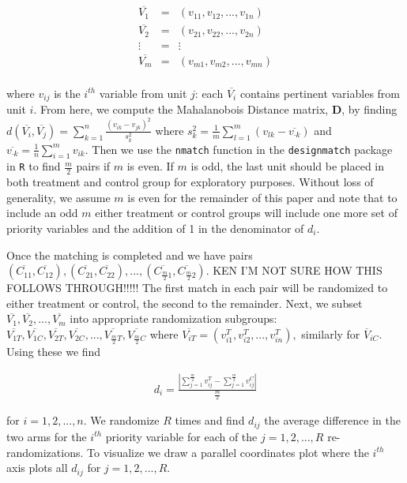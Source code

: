 \documentclass[]{sagej}
\begin{document}
\begin{eqnarray*}
 \overline{V_1} & = & (v_{11}, v_{12},..., v_{1n})\\
 \overline{V_2} & = & (v_{21}, v_{22},..., v_{2n})\\
 \vdots & = & \vdots\\    
 \overline{V_m} & = & (v_{m1}, v_{m2},..., v_{mn})\\
\end{eqnarray*}

where \(v_{ij}\) is the \(i^{th}\) variable from unit \(j\): each
\(\overline{V_i}\) contains pertinent variables from unit \(i\). From
here, we compute the Mahalanobois Distance matrix, \textbf{D}, by
finding
\(d(\overline{V_i}, \overline{V_j}) = \sum_{k=1}^n \frac{(v_{ik} - v_{jk})^2}{s_k^2}\)
where
\(s_k^2 = \frac{1}{m} \sum_{l=1}^m(v_{lk} - \overline{v_{\cdot k}})\)
and \(\overline{v_{\cdot k}} = \frac{1}{n} \sum_{i = 1}^m v_{ik}\). Then
we use the \texttt{nmatch} function in the \texttt{designmatch}
\citep{doi} package in \texttt{R} \citep{nmatch} to find \(\frac{m}{2}\)
pairs if \(m\) is even. If \(m\) is odd, the last unit should be placed
in both treatment and control group for exploratory purposes. Without
loss of generality, we assume \(m\) is even for the remainder of this
paper and note that to include an odd \(m\) either treatment or control
groups will include one more set of priority variables and the addition
of 1 in the denominator of \(d_i\).

Once the matching is completed and we have pairs
\((\overline{C_{11}}, \overline{C_{12}}), (\overline{C_{21}}, \overline{C_{22}}), ..., (\overline{C_{\frac{m}{2}1}}, \overline{C_{\frac{m}{2}2}}).\)
KEN I'M NOT SURE HOW THIS FOLLOWS THROUGH!!!!! The first match in each
pair will be randomized to either treatment or control, the second to
the remainder. Next, we subset
\(\overline{V_1}, \overline{V_2}, ..., \overline{V_m}\) into appropriate
randomization subgroups:
\(\overline{V_{1T}}, \overline{V_{1C}}, \overline{V_{2T}}, \overline{V_{2C}},..., \overline{V_{\frac{m}{2}T}}, \overline{V_{\frac{m}{2}C}}\)
where \(\overline{V_{iT}} = (v_{i1}^T, v_{i2}^T,..., v_{in}^T),\)
similarly for \(\overline{V}_{iC}.\) Using these we find

\begin{eqnarray*}
 d_i = \frac{| \sum_{j = 1}^{\frac{m}{2}}v_{ij}^T - \sum_{j = 1}^{\frac{m}{2}}v_{ij}^C |}{\frac{m}{2}} 
\end{eqnarray*}

for \(i = 1, 2, ..., n.\) We randomize \(R\) times and find \(d_{ij}\)
the average difference in the two arms for the \(i^{th}\) priority
variable for each of the \(j = 1, 2, ..., R\) re-randomizations. To
visualize we draw a parallel coordinates plot where the \(i^{th}\) axis
plots all \(d_{ij}\) for \(j = 1, 2, ..., R.\)
\end{document}
